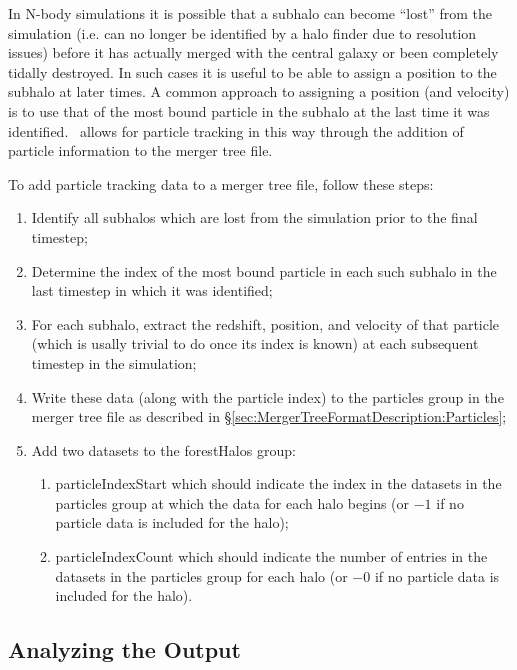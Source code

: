 In N-body simulations it is possible that a subhalo can become ``lost'' from the simulation (i.e. can no longer be identified by a halo finder due to resolution issues) before it has actually merged with the central galaxy or been completely tidally destroyed. In such cases it is useful to be able to assign a position to the subhalo at later times. A common approach to assigning a position (and velocity) is to use that of the most bound particle in the subhalo at the last time it was identified. \glc\ allows for particle tracking in this way through the addition of particle information to the merger tree file.

To add particle tracking data to a merger tree file, follow these steps:
\begin{enumerate}
\item Identify all subhalos which are lost from the simulation prior to the final timestep;
\item Determine the index of the most bound particle in each such subhalo in the last timestep in which it was identified;
\item For each subhalo, extract the redshift, position, and velocity of that particle (which is usally trivial to do once its index is known) at each subsequent timestep in the simulation;
\item Write these data (along with the particle index) to the {\normalfont \ttfamily particles} group in the merger tree file as described in \S\ref{sec:MergerTreeFormatDescription:Particles};
\item Add two datasets to the {\normalfont \ttfamily forestHalos} group:
  \begin{enumerate}
  \item {\normalfont \ttfamily particleIndexStart} which should indicate the index in the datasets in the {\normalfont \ttfamily particles} group at which the data for each halo begins (or $-1$ if no particle data is included for the halo);
  \item {\normalfont \ttfamily particleIndexCount} which should indicate the number of entries in the datasets in the {\normalfont \ttfamily particles} group for each halo (or $-0$ if no particle data is included for the halo).
  \end{enumerate}
\end{enumerate}

\subsection{Analyzing the Output}

